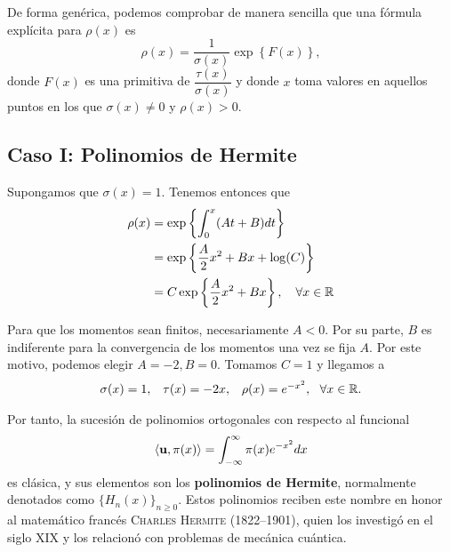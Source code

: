 De forma genérica, podemos comprobar de manera sencilla que una fórmula explícita para $\rho(x)$ es
\begin{equation}
    \label{eq:rho-general}
    \rho(x) = \dfrac{1}{\sigma(x)}\exp\left\{F(x)\right\},
\end{equation}
donde $F(x)$ es una primitiva de $\dfrac{\tau(x)}{\sigma(x)}$ y donde $x$ toma valores en aquellos puntos en los que $\sigma(x)\neq 0$ y $\rho(x)>0$.

\subsection{Caso I: Polinomios de Hermite}
\label{subsection:Hermite}

Supongamos que $\sigma(x)=1$. Tenemos entonces que
\begin{equation*}
    \begin{split}
        \rho(x) &= \exp\left\{ \int_0^x (At+B)dt \right\}\\
        &= \exp\left\{ \dfrac{A}{2}x^2+Bx+\log(C) \right\} \\
        &= C \exp\left\{ \dfrac{A}{2}x^2+Bx \right\}, \ \ \ \forall x\in\mathbb{R}
    \end{split}
\end{equation*}

Para que los momentos sean finitos, necesariamente $A<0$. Por su parte, $B$ es indiferente para la convergencia de los momentos una vez se fija $A$. Por este motivo, podemos elegir $A=-2, B=0$. Tomamos $C=1$ y llegamos a 
\begin{equation}
    \label{eq:parametros-hermite}
    \begin{array}{ccc}
        \sigma(x)=1, & \tau(x)=-2x, & \rho(x) = e^{-x^2}, \ \ \forall x \in \R.
    \end{array}
\end{equation}

Por tanto, la sucesión de polinomios ortogonales con respecto al funcional
\begin{equation}
    \label{eq:func-hermite}
    \left\langle \mathbf{u} , \pi(x) \right\rangle = \int_{-\infty}^\infty \pi(x)e^{-x^2}dx
\end{equation}
es clásica, y sus elementos son los \textbf{polinomios de Hermite}, normalmente denotados como $\{H_n(x)\}_{n\geq 0}$. Estos polinomios reciben este nombre en honor al matemático francés \textsc{Charles Hermite} (1822--1901), quien los investigó en el siglo XIX y los relacionó con problemas de mecánica cuántica.

